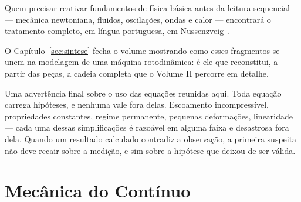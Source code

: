 \documentclass[12pt,a4paper]{article}
\numberwithin{equation}{section}
\numberwithin{table}{section}
\numberwithin{figure}{section}
\begin{document}
Quem precisar reativar fundamentos de física básica antes da leitura
sequencial --- mecânica newtoniana, fluidos, oscilações, ondas e calor ---
encontrará o tratamento completo, em língua portuguesa, em
Nussenzveig~\cite{nussenzveig}.

O Capítulo~\ref{sec:sintese} fecha o volume mostrando como esses fragmentos se
unem na modelagem de uma máquina rotodinâmica: é ele que reconstitui, a partir
das peças, a cadeia completa que o Volume II percorre em detalhe.

Uma advertência final sobre o uso das equações reunidas aqui. Toda equação
carrega hipóteses, e nenhuma vale fora delas. Escoamento incompressível,
propriedades constantes, regime permanente, pequenas deformações, linearidade
--- cada uma dessas simplificações é razoável em alguma faixa e desastrosa
fora dela. Quando um resultado calculado contradiz a observação, a primeira
suspeita não deve recair sobre a medição, e sim sobre a hipótese que deixou de
ser válida.


\section{Mecânica do Contínuo}\label{sec:continuo}

\end{document}
